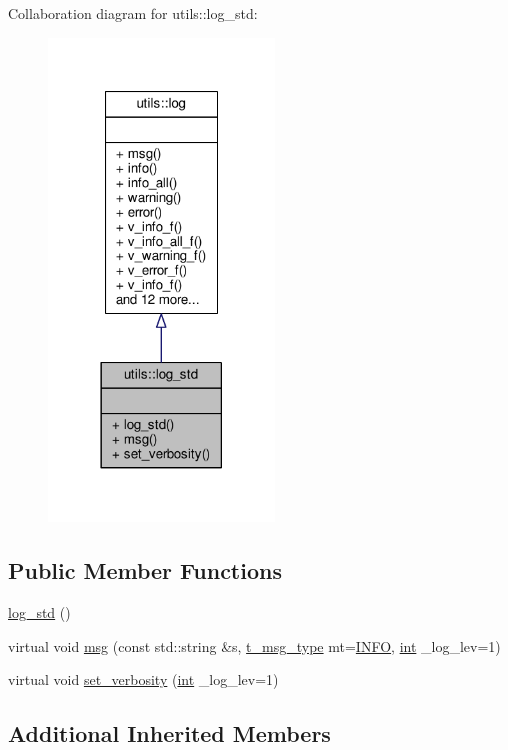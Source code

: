 Collaboration diagram for utils\-:\-:log\-\_\-std\-:\nopagebreak
\begin{figure}[H]
\begin{center}
\leavevmode
\includegraphics[width=170pt]{classutils_1_1log__std__coll__graph}
\end{center}
\end{figure}
\subsection*{Public Member Functions}
\begin{DoxyCompactItemize}
\item 
\hyperlink{classutils_1_1log__std_ad679600636b9335722ed81bd700407d2}{log\-\_\-std} ()
\item 
virtual void \hyperlink{classutils_1_1log__std_ac33e014ef7475b4ba4103561570dba5e}{msg} (const std\-::string \&s, \hyperlink{classutils_1_1log_a295e2ee43d4e5ade12dd5de546cb1983}{t\-\_\-msg\-\_\-type} mt=\hyperlink{classutils_1_1log_a295e2ee43d4e5ade12dd5de546cb1983a34a1a7830fae0bde90731e751a1ed9c0}{I\-N\-F\-O}, \hyperlink{classint}{int} \-\_\-log\-\_\-lev=1)
\item 
virtual void \hyperlink{classutils_1_1log__std_a8b7dc418de81361650e4033eaa98a476}{set\-\_\-verbosity} (\hyperlink{classint}{int} \-\_\-log\-\_\-lev=1)
\end{DoxyCompactItemize}
\subsection*{Additional Inherited Members}


